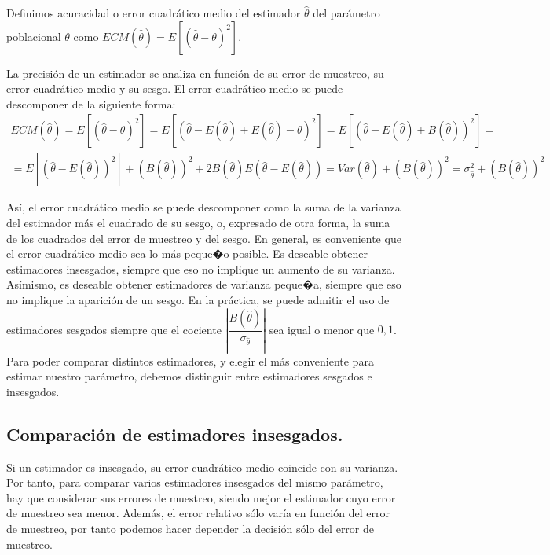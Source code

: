 Definimos acuracidad o error cuadr\'atico medio del estimador $\hat{\theta}$
del par\'ametro poblacional $\theta$ como $ECM\left(\hat{\theta}\right)=E\left[\left(\hat{\theta}-\theta\right)^{2}\right]$.

La precisi\'on de un estimador se analiza en funci\'on de su error de
muestreo, su error cuadr\'atico medio y su sesgo. El error cuadr\'atico
medio se puede descomponer de la siguiente forma: 
\[
\begin{array}{c}
ECM\left(\hat{\theta}\right)=E\left[\left(\hat{\theta}-\theta\right)^{2}\right]=E\left[\left(\hat{\theta}-E\left(\hat{\theta}\right)+E\left(\hat{\theta}\right)-\theta\right)^{2}\right]=E\left[\left(\hat{\theta}-E\left(\hat{\theta}\right)+B\left(\hat{\theta}\right)\right)^{2}\right]=\\
=E\left[\left(\hat{\theta}-E\left(\hat{\theta}\right)\right)^{2}\right]+\left(B\left(\hat{\theta}\right)\right)^{2}+2B\left(\hat{\theta}\right)E\left(\hat{\theta}-E\left(\hat{\theta}\right)\right)=Var\left(\hat{\theta}\right)+\left(B\left(\hat{\theta}\right)\right)^{2}=\sigma_{\hat{\theta}}^{2}+\left(B\left(\hat{\theta}\right)\right)^{2}
\end{array}
\]


As\'i, el error cuadr\'atico medio se puede descomponer como la suma de
la varianza del estimador m\'as el cuadrado de su sesgo, o, expresado
de otra forma, la suma de los cuadrados del error de muestreo y del
sesgo. En general, es conveniente que el error cuadr\'atico medio sea
lo m\'as peque�o posible. Es deseable obtener estimadores insesgados,
siempre que eso no implique un aumento de su varianza. As\'imismo, es
deseable obtener estimadores de varianza peque�a, siempre que eso
no implique la aparici\'on de un sesgo. En la pr\'actica, se puede admitir
el uso de estimadores sesgados siempre que el cociente $\left|\dfrac{B\left(\hat{\theta}\right)}{\sigma_{\hat{\theta}}}\right|$
sea igual o menor que $0,1$. Para poder comparar distintos estimadores,
y elegir el m\'as conveniente para estimar nuestro par\'ametro, debemos
distinguir entre estimadores sesgados e insesgados.


\subsection{Comparaci\'on de estimadores insesgados.}

Si un estimador es insesgado, su error cuadr\'atico medio coincide con
su varianza. Por tanto, para comparar varios estimadores insesgados
del mismo par\'ametro, hay que considerar sus errores de muestreo, siendo
mejor el estimador cuyo error de muestreo sea menor. Adem\'as, el error
relativo s\'olo var\'ia en funci\'on del error de muestreo, por tanto podemos
hacer depender la decisi\'on s\'olo del error de muestreo.



